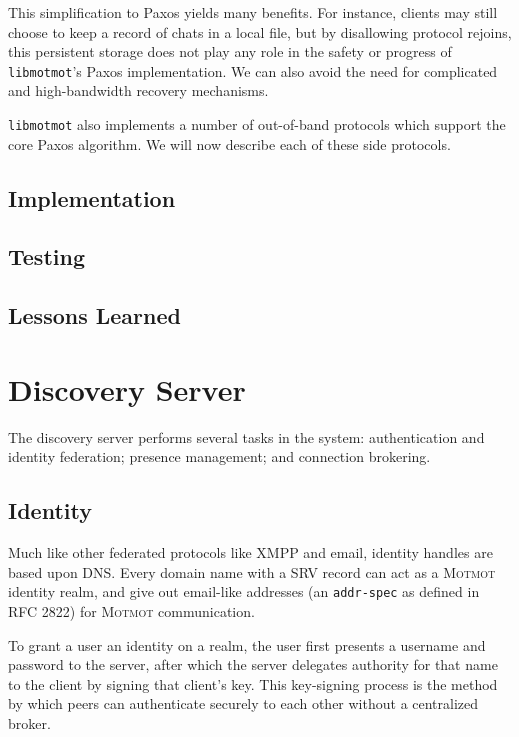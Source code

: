 \documentclass{sig-alternate}
\newcommand\Motmot{\textsc{Motmot}\xspace}
\newcommand\libmotmot{\texttt{libmotmot}\xspace}
\begin{document}
This simplification to Paxos yields many benefits.  For instance, clients may
still choose to keep a record of chats in a local file, but by disallowing
protocol rejoins, this persistent storage does not play any role in the safety
or progress of \libmotmot's Paxos implementation.  We can also avoid the need
for complicated and high-bandwidth recovery mechanisms.

\libmotmot also implements a number of out-of-band protocols which support
the core Paxos algorithm.  We will now describe each of these side protocols.

\subsection{Implementation}

\subsection{Testing}

\subsection{Lessons Learned}


\section{Discovery Server}

The discovery server performs several tasks in the system: authentication and
identity federation; presence management; and connection brokering.

\subsection{Identity}

Much like other federated protocols like XMPP and email, identity handles are
based upon DNS. Every domain name with a SRV record can act as a \Motmot
identity realm, and give out email-like addresses (an \verb`addr-spec` as
defined in RFC 2822) for \Motmot communication.

To grant a user an identity on a realm, the user first presents a username and
password to the server, after which the server delegates authority for that name
to the client by signing that client's key. This key-signing process is the
method by which peers can authenticate securely to each other without a
centralized broker.
\end{document}
